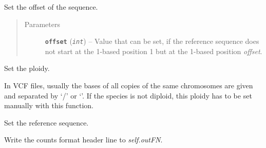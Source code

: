 \documentclass[letterpaper,10pt,english]{sphinxmanual}
\begin{document}
\begin{fulllineitems}
\begin{fulllineitems}
\begin{quote}
\begin{description}
\end{description}\end{quote}

\end{fulllineitems}


\begin{fulllineitems}
\label{cf:libPoMo.cf.CFWriter.set_offset}
Set the offset of the sequence.
\begin{quote}\begin{description}
\item[{Parameters}] \leavevmode
\textbf{\texttt{offset}} (\emph{\texttt{int}}) -- Value that can be set, if the reference
sequence does not start at the 1-based
position 1 but at the 1-based position
\emph{offset}.

\end{description}\end{quote}

\end{fulllineitems}


\begin{fulllineitems}
\label{cf:libPoMo.cf.CFWriter.set_ploidy}
Set the ploidy.

In VCF files, usually the bases of all copies of the same
chromosomes are given and separated by `/' or `\textbar{}'.  If the
species is not diploid, this ploidy has to be set manually
with this function.

\end{fulllineitems}


\begin{fulllineitems}
\label{cf:libPoMo.cf.CFWriter.set_seq}
Set the reference sequence.

\end{fulllineitems}


\begin{fulllineitems}
\label{cf:libPoMo.cf.CFWriter.write_HLn}
Write the counts format header line to \emph{self.outFN}.


\end{fulllineitems}
\end{fulllineitems}
\end{document}
